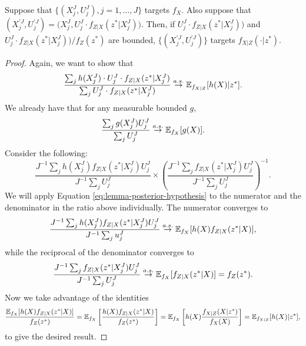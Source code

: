 \begin{lem}
    \label{lem:posterior-proper-weights}
    Suppose that $\{(X_j^J,U_j^J),j=1,\dots,J\}$ targets $f_X$. Also suppose that $(X^{\prime J}_j,U^{\prime J}_j) = \big(X_j^J,U_j^J \cdot f_{Z|X}(z^*|X_j^J)\big)$. Then, if $U_j^J \cdot f_{Z|X}(z^*|X_j^J)\big)$ and $U_j^J \cdot f_{Z|X}(z^*|X_j^J)\big) / f_Z(z^*)$ are bounded, $\{(X^{\prime J}_j,U^{\prime J}_j)\}$ targets $f_{X|Z}(\cdot | z^*)$.
\end{lem}

\begin{proof}
    Again, we want to show that
     $$\frac{\sum_j h(X_j^J) \cdot U_j^J \cdot f_{Z|X}(z^*|X_j^J)}{\sum_j U_j^J \cdot f_{Z|X}(z^*|X_j^J)} \stackrel{a.s.}{\to} \mathbb{E}_{f_{X|Z}}[h(X)|z^*].$$
    We already have that for any measurable bounded $g$,
    \begin{equation}
        \frac{\sum_j g(X_j^J)U_j^J}{\sum_j U_j^J} \stackrel{a.s.}{\to} \mathbb{E}_{f_X}[g(X)].
        \label{eq:lemma-posterior-hypothesis}
    \end{equation}
    Consider the following:
    \begin{equation}
    \frac{J^{-1} \sum_j h(X_j^J) f_{Z|X}(z^*|X_j^J) {U}_j^{J}}{J^{-1} \sum_j {U}_j^{J}}
    \times \left( \frac{J^{-1} \sum_j f_{Z|X}(z^*|X_j^J) {U}_j^{J}}{J^{-1} \sum_j {U}_j^{J}} \right)^{-1}.
    \end{equation}
    We will apply Equation \ref{eq:lemma-posterior-hypothesis} to the numerator and the denominator in the ratio above individually. The numerator converges to 
    $$\frac{J^{-1} \sum_j h(X_j^J) f_{Z|X}(z^*|X_j^J) {U}_j^{J}}{J^{-1} \sum_j {u}_j^{J}} \stackrel{a.s.}{\to} \mathbb{E}_{f_X}[h(X)f_{Z|X}(z^*|X)],$$
    while the reciprocal of the denominator converges to 
    $$ \frac{J^{-1} \sum_j f_{Z|X}(z^*|X_j^J) {U}_j^{J}}{J^{-1} \sum_j {U}_j^{J}}  \stackrel{a.s.}{\to} \mathbb{E}_{f_X}[f_{Z|X}(z^*|X)] = f_Z(z^*).$$
    Now we take advantage of the identities
    $$\frac{\mathbb{E}_{f_X}[h(X)f_{Z|X}(z^*|X)]}{f_Z(z^*)} = \mathbb{E}_{f_X}\left[\frac{h(X)f_{Z|X}(z^*|X)}{f_Z(z^*)}\right] = \mathbb{E}_{f_X}\left[h(X)\frac{f_{X|Z}(X|z^*)}{f_X(X)}\right] =  \mathbb{E}_{f_{X|Z}}[h(X)|z^*],$$
    to give the desired result.
    

\end{proof}
